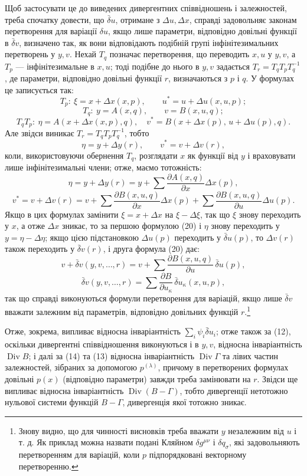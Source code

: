 \documentclass[11pt]{article}
\providecommand{\D}{\Delta}
\providecommand{\p}{\partial}
\DeclareMathOperator{\Div}{Div}
\providecommand{\bd}{\bar{\delta}}
\begin{document}
Щоб застосувати це до виведених дивергентних співвідношень і залежностей, треба спочатку довести, що \(\bd u\), отримане з \(\D u,\D x\), справді задовольняє законам перетворення для варіації \(\delta u\), якщо лише параметри, відповідно довільні функції в \(\bd v\), визначено так, як вони відповідають подібній групі інфінітезимальних перетворень у \(y,v\). Нехай \(T_q\) позначає перетворення, що переводить \(x,u\) у \(y,v\), а \(T_p\) --- інфінітезимальне в \(x,u\); тоді подібне до нього в \(y,v\) задається \(T_r=T_qT_pT_q^{-1}\), де параметри, відповідно довільні функції \(r\), визначаються з \(p\) і \(q\). У формулах це записується так:
\[
T_p:\ \xi=x+\D x(x,p),\qquad u^*=u+\D u(x,u,p);
\]
\[
T_q:\ y=A(x,q),\qquad v=B(x,u,q);
\]
\[
T_qT_p:\ \eta=A(x+\D x(x,p),q),\quad
v^*=B(x+\D x(p),\,u+\D u(p),q).
\]
Але звідси виникає \(T_r=T_qT_pT_q^{-1}\), тобто
\[
\eta=y+\D y(r),\qquad v^*=v+\D v(r),
\]
коли, використовуючи обернення \(T_q\), розглядати \(x\) як функції від \(y\) і враховувати лише інфінітезимальні члени; отже, маємо тотожність:
\begin{equation}
\eta=y+\D y(r)=y+\sum\frac{\p A(x,q)}{\p x}\D x(p),
\tag{20a}
\end{equation}
\begin{equation}
v^*=v+\D v(r)=v+\sum\frac{\p B(x,u,q)}{\p x}\D x(p)
+\sum\frac{\p B(x,u,q)}{\p u}\D u(p).
\tag{20b}
\end{equation}
Якщо в цих формулах замінити \(\xi=x+\D x\) на \(\xi-\D \xi\), так що \(\xi\) знову переходить у \(x\), а отже \(\D x\) зникає, то за першою формулою (20) і \(\eta\) знову переходить у \(y=\eta-\D\eta\); якщо цією підстановкою \(\D u(p)\) переходить у \(\bd u(p)\), то \(\D v(r)\) також переходить у \(\bd v(r)\), і друга формула (20) дає:
\[
v+\bd v(y,v,\ldots,r)=v+\sum\frac{\p B(x,u,q)}{\p u}\,\bd u(p),
\]
\[
\bd v(y,v,\ldots,r)=\sum\frac{\p B}{\p u_\kappa}\,\bd u_\kappa(x,u,p),
\]
так що справді виконуються формули перетворення для варіацій, якщо лише \(\bd v\) вважати залежним від параметрів, відповідно довільних функцій \(r\).\footnote{Знову видно, що для чинності висновків треба вважати \(y\) незалежним від \(u\) і т. д. Як приклад можна назвати подані Кляйном \(\delta g^{\mu\nu}\) і \(\delta q_\sigma\), які задовольняють перетворенням для варіацій, коли \(p\) підпорядковані векторному перетворенню.}

Отже, зокрема, випливає відносна інваріантність \(\sum_i\psi_i\bd u_i\); отже також за (12), оскільки дивергентні співвідношення виконуються і в \(y,v\), відносна інваріантність \(\Div B\); і далі за (14) та (13) відносна інваріантність \(\Div\Gamma\) та лівих частин залежностей, зібраних за допомогою \(p^{(\lambda)}\), причому в перетворених формулах довільні \(p(x)\) (відповідно параметри) завжди треба замінювати на \(r\). Звідси ще випливає відносна інваріантність \(\Div(B-\Gamma)\), тобто дивергенції нетотожно нульової системи функцій \(B-\Gamma\), дивергенція якої тотожно зникає.
\end{document}
